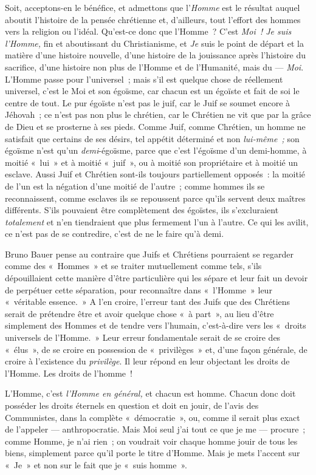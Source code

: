 \documentclass[french,twoside]{book} %
\begin{document}
Soit, acceptons-en le bénéfice, et admettons que l’\emph{Homme} est le résultat auquel aboutit l’histoire de la pensée chrétienne et, d’ailleurs, tout l’effort des hommes vers la religion ou l’idéal. Qu’est-ce donc que l’Homme ? C’est \emph{Moi ! Je \emph{suis} l’Homme,} fin et  aboutissant du Christianisme, et \emph{Je} suis le point de départ et la matière d’une histoire nouvelle, d’une histoire de la jouissance après l’histoire du sacrifice, d’une histoire non plus de l’Homme et de l’Humanité, mais du — \emph{Moi}. L’Homme passe pour l’universel ; mais s’il est quelque chose de réellement universel, c’est le Moi et son égoïsme, car chacun est un égoïste et fait de soi le centre de tout. Le pur égoïste n’est pas le juif, car le Juif se soumet encore à Jéhovah ; ce n’est pas non plus le chrétien, car le Chrétien ne vit que par la grâce de Dieu et se prosterne à ses pieds. Comme Juif, comme Chrétien, un homme ne satisfait que certains de ses désirs, tel appétit déterminé et non \emph{lui-même ;} son égoïsme n’est qu’un \emph{demi}-égoïsme, parce que c’est l’égoïsme d’un demi-homme, à moitié « lui » et à moitié « juif », ou à moitié son propriétaire et à moitié un esclave. Aussi Juif et Chrétien sont-ils toujours partiellement opposés : la moitié de l’un est la négation d’une moitié de l’autre ; comme hommes ils se reconnaissent, comme esclaves ils se repoussent parce qu’ils servent deux maîtres différents. S’ils pouvaient être complètement des égoïstes, ils s’excluraient \emph{totalement }et n’en tiendraient que plus fermement l’un à l’autre. Ce qui les avilit, ce n’est pas de se contredire, c’est de ne le faire qu’à demi.\par
Bruno Bauer pense au contraire que Juifs et Chrétiens pourraient se regarder comme des « Hommes » et se traiter mutuellement comme tels, s’ils dépouillaient cette manière d’être particulière qui les sépare et leur fait un devoir de perpétuer cette séparation, pour reconnaître dans « l’Homme » leur « véritable essence. » A l’en croire, l’erreur tant des Juifs que des Chrétiens serait de prétendre être et avoir quelque chose « à part », au lieu d’être simplement des Hommes et de tendre vers l’humain, c’est-à-dire vers les « droits universels de l’Homme. » Leur erreur fondamentale serait de se croire des  « élus », de se croire en possession de « privilèges » et, d’une façon générale, de croire à l’existence du \emph{privilège}. Il leur répond en leur objectant les droits de l’Homme. Les droits de l’homme !\par
L’Homme, c’est \emph{l’Homme en général,} et chacun est homme. Chacun donc doit posséder les droits éternels en question et doit en jouir, de l’avis des Communistes, dans la complète « démocratie », ou, comme il serait plus exact de l’appeler — anthropocratie. Mais Moi seul j’ai tout ce que je me — procure ; comme Homme, je n’ai rien ; on voudrait voir chaque homme jouir de tous les biens, simplement parce qu’il porte le titre d’Homme. Mais je mets l’accent sur « Je » et non sur le fait que je « suis homme ».\par
\end{document}
